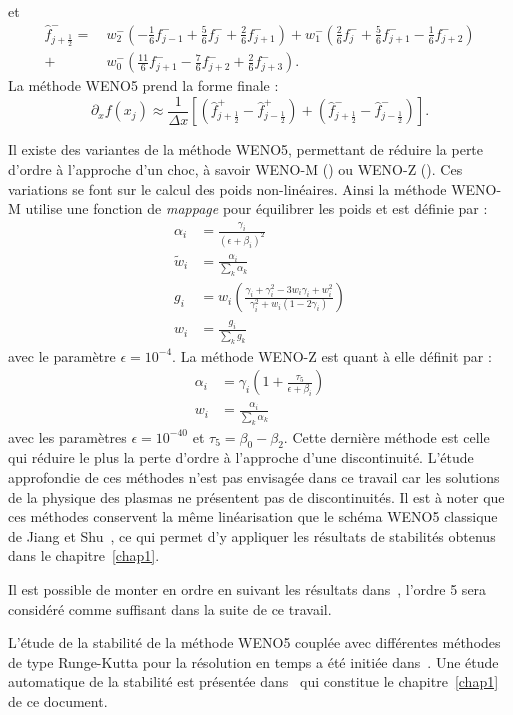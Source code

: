 et
$$
  \begin{aligned}
    \hat{f}_{j+\frac{1}{2}}^-   =\ & w_2^-\left( -\frac{1}{6}f^-_{j-1} + \frac{5}{6}f^-_{j}   + \frac{2}{6}f^-_{j+1} \right)
                                +    w_1^-\left(  \frac{2}{6}f^-_{j}   + \frac{5}{6}f^-_{j+1} - \frac{1}{6}f^-_{j+2} \right) \\
                                +  & w_0^-\left( \frac{11}{6}f^-_{j+1} - \frac{7}{6}f^-_{j+2} + \frac{2}{6}f^-_{j+3} \right).
  \end{aligned}
$$
La méthode WENO5 prend la forme finale :
$$
  \partial_xf(x_j) \approx \frac{1}{\Delta x}\left[ \left(\hat{f}_{j+\frac{1}{2}}^+ - \hat{f}_{j-\frac{1}{2}}^+ \right) + \left(\hat{f}_{j+\frac{1}{2}}^- - \hat{f}_{j-\frac{1}{2}}^- \right) \right].
$$

Il existe des variantes de la méthode WENO5, permettant de réduire la perte d'ordre à l'approche d'un choc, à savoir WENO-M (\cite{Henrick:2005}) ou WENO-Z (\cite{Borges:2008}). Ces variations se font sur le calcul des poids non-linéaires. Ainsi la méthode WENO-M utilise une fonction de \emph{mappage} pour équilibrer les poids et est définie par :
$$
  \begin{aligned}
    \alpha_i    &= \frac{\gamma_i}{(\epsilon + \beta_i)^2} \\
    \tilde{w}_i &= \frac{\alpha_i}{\sum_k \alpha_k} \\
    g_i         &= w_i\left( \frac{\gamma_i + \gamma_i^2 - 3w_i\gamma_i + w_i^2}{\gamma_i^2 + w_i(1-2\gamma_i)} \right) \\
    w_i         &= \frac{g_i}{\sum_k g_k}
  \end{aligned}
$$
avec le paramètre $\epsilon = 10^{-4}$. La méthode WENO-Z est quant à elle définit par :
$$
  \begin{aligned}
    \alpha_i &= \gamma_i\left( 1+ \frac{\tau_5}{\epsilon + \beta_i} \right) \\
    w_i      &= \frac{\alpha_i}{\sum_k \alpha_k}
  \end{aligned}
$$
avec les paramètres $\epsilon = 10^{-40}$ et $\tau_5 = \beta_0 - \beta_2$. Cette dernière méthode est celle qui réduire le plus la perte d'ordre à l'approche d'une discontinuité. L'étude approfondie de ces méthodes n'est pas envisagée dans ce travail car les solutions de la physique des plasmas ne présentent pas de discontinuités. Il est à noter que ces méthodes conservent la même linéarisation que le schéma WENO5 classique de Jiang et Shu~\cite{Jiang:1996}, ce qui permet d'y appliquer les résultats de stabilités obtenus dans le chapitre~\ref{chap1}.

Il est possible de monter en ordre en suivant les résultats dans~\cite{Wu:2021}, l'ordre 5 sera considéré comme suffisant dans la suite de ce travail.

L'étude de la stabilité de la méthode WENO5 couplée avec différentes méthodes de type Runge-Kutta pour la résolution en temps a été initiée dans~\cite{Wang:2007,Motamed:2010,Lunet:2017}. Une étude automatique de la stabilité est présentée dans~\cite{Crouseilles:2019b} qui constitue le chapitre~\ref{chap1} de ce document.





